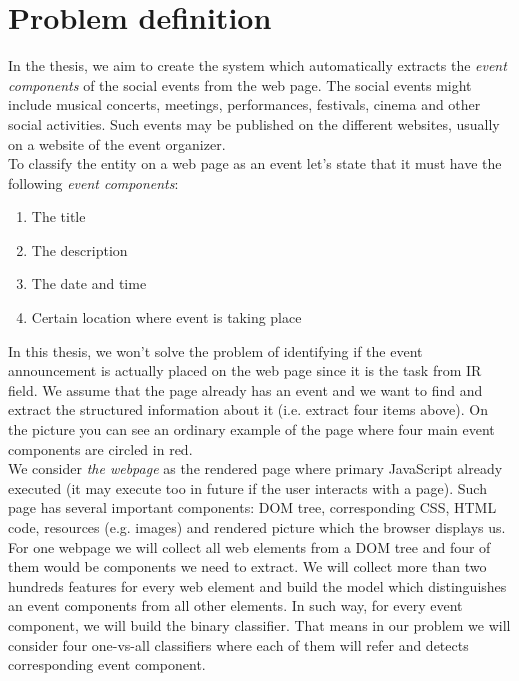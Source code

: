 \section{Problem definition}
In the thesis, we aim to create the system which automatically extracts the \textit{event components} of the social events from the web page. The social events might include musical concerts, meetings, performances, festivals, cinema and other social activities. Such events may be published on the different websites, usually on a website of the event organizer.\\

To classify the entity on a web page as an event let's state that it must have the following \textit{event components}:
\begin{enumerate}
    \item The title
    \item The description
    \item The date and time
    \item Certain location where event is taking place
\end{enumerate}

In this thesis, we won't solve the problem of identifying if the event announcement is actually placed on the web page since it is the task from IR field. We assume that the page already has an event and we want to find and extract the structured information about it (i.e. extract four items above). On the picture  you can see an ordinary example of the page where four main event components are circled in red.\\

We consider \textit{the webpage} as the rendered page where primary JavaScript already executed (it may execute too in future if the user interacts with a page). Such page has several important components: DOM tree, corresponding CSS, HTML code, resources (e.g. images) and rendered picture which the browser displays us. \\

For one webpage we will collect all web elements from a DOM tree and four of them would be components we need to extract. We will collect more than two hundreds features for every web element and build the model which distinguishes an event components from all other elements. In such way, for every event component, we will build the binary classifier. That means in our problem we will consider four one-vs-all classifiers where each of them will refer and detects corresponding event component. 

